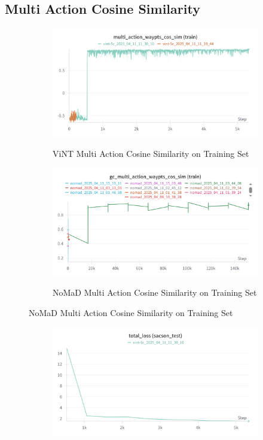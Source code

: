 \documentclass[12pt]{article}
\begin{document}
\begin{appendices}
\subsection*{Multi Action Cosine Similarity}
\begin{figure}[H]
    \centering
    \begin{subfigure}[b]{0.48\textwidth}
        \centering
        \includegraphics[width=\textwidth]{images/multiaction_train_vint.png}
        \label{fig:multiaction_train_vint}
        \caption{ViNT Multi Action Cosine Similarity on Training Set}
    \end{subfigure}
    \hfill
    \begin{subfigure}[b]{0.48\textwidth}
        \centering
        \includegraphics[width=\textwidth]{images/gc_multi_action_waypts_cos_sim.png}
        \label{fig:multiaction_train_nomad}
        \caption{NoMaD Multi Action Cosine Similarity on Training Set}
    \end{subfigure}
\end{figure}
\begin{figure}[H]
    \centering
    \begin{subfigure}[b]{0.48\textwidth}
        \centering
        \includegraphics[width=\textwidth]{images/multiaction_test_vint.png}

\end{subfigure}
\end{figure}
\end{appendices}
\end{document}
